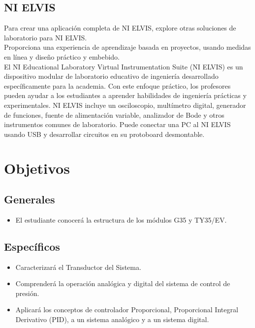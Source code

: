 \documentclass[]{article}
\begin{document}
\subsection{NI ELVIS}

Para crear una aplicación completa de NI ELVIS, explore otras soluciones de laboratorio para NI ELVIS.\\

Proporciona una experiencia de aprendizaje basada en proyectos, usando medidas en línea y diseño práctico y embebido.\\

El NI Educational Laboratory Virtual Instrumentation Suite (NI ELVIS) es un dispositivo modular de laboratorio educativo de ingeniería desarrollado específicamente para la academia. Con este enfoque práctico, los profesores pueden ayudar a los estudiantes a aprender habilidades de ingeniería prácticas y experimentales. NI ELVIS incluye un osciloscopio, multímetro digital, generador de funciones, fuente de alimentación variable, analizador de Bode y otros instrumentos comunes de laboratorio. Puede conectar una PC al NI ELVIS usando USB y desarrollar circuitos en su protoboard desmontable.\cite{NationalInstruments2018}\\


\section{Objetivos}




\subsection{Generales}

\begin{itemize}
	\item El estudiante conocerá la estructura de los módulos G35 y TY35/EV.
\end{itemize}

\subsection{Específicos}

	\begin{itemize}
			\item Caracterizará el Transductor del Sistema.
			\item Comprenderá la operación analógica y digital del sistema de control
			de presión.
			\item Aplicará los conceptos de controlador Proporcional, Proporcional
			Integral Derivativo (PID), a un sistema analógico y a un sistema
			digital.
	\end{itemize}
\end{document}
